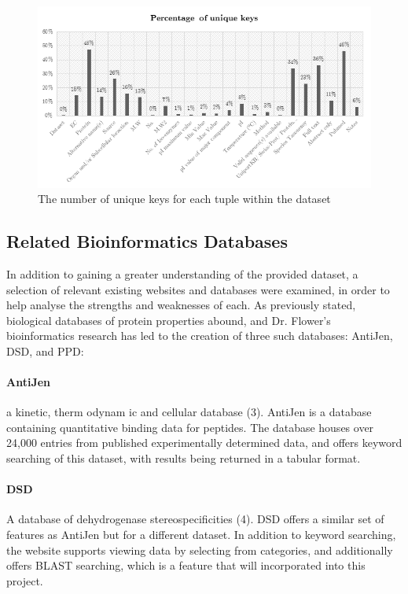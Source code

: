 \documentclass[12pt,a4paper]{article}
\begin{document}
\begin{figure}[H]
\centering
\includegraphics{assets/chart-dataset-unique.png}
\caption{The number of unique keys for each tuple within the dataset}
\label{fig:chart-dataset-unique}
\end{figure}

\newpage
\subsection{Related Bioinformatics Databases}
In addition to gaining a greater understanding of the provided dataset, a
selection of relevant existing websites and databases were examined, in order to
help analyse the strengths and weaknesses of each. As previously stated,
biological databases of protein properties abound, and Dr. Flower's
bioinformatics research has led to the creation of three such databases:
AntiJen, DSD, and PPD:

\paragraph{AntiJen} a kinetic, therm odynam ic and cellular database
(3). AntiJen is a database containing quantitative binding data for
peptides. The database houses over 24,000 entries from published experimentally
determined data, and offers keyword searching of this dataset, with results
being returned in a tabular format.

\paragraph{DSD} A database of dehydrogenase stereospecificities (4). DSD offers
a similar set of features as AntiJen but for a different dataset. In addition to
keyword searching, the website supports viewing data by selecting from
categories, and additionally offers BLAST searching, which is a feature that
will incorporated into this project.
\end{document}
